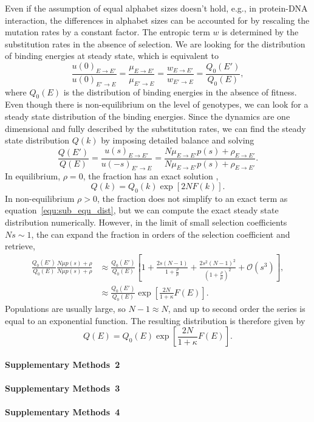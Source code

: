 \documentclass[10pt,a4paper]{article}
\begin{document}
Even if the assumption of equal alphabet sizes doesn't hold, e.g., in protein-DNA interaction, the differences in alphabet sizes can be accounted for 
by rescaling the mutation rates by a constant factor. The entropic term $w$ is determined by the substitution rates in the absence of selection.
We are looking for the distribution of binding energies at steady state, which is equivalent to 
\begin{equation}
\frac{u(0)_{E\rightarrow E'}}{u(0)_{E'\rightarrow E}} = \frac{\mu_{E\rightarrow E'}}{\mu_{E'\rightarrow E}}= \frac{w_{E\rightarrow E'}}{w_{E'\rightarrow E}} = 
\frac{Q_0(E')}{Q_0(E)},
\end{equation}
where $Q_0(E)$ is the distribution of binding energies in the absence of fitness. Even though there is non-equilibrium on the level of genotypes, 
we can look for a steady state distribution of the binding energies. Since the dynamics are one dimensional and fully described by the substitution rates, 
we can find the steady state distribution $Q(k)$ by imposing detailed balance and solving
\begin{equation}
\frac{Q(E')}{Q(E)}=\frac{u(s)_{E\rightarrow E'}}{u(-s)_{E'\rightarrow E}}=  \frac{ N\mu_{E\rightarrow E'}p(s)+\rho_{E\rightarrow E'}}{N\mu_{E\rightarrow E'}p(s)
+\rho_{E\rightarrow E'}}.
\end{equation}
In equilibrium, $\rho=0$, the fraction has an exact solution \cite{berg_adaptive_2004},
\begin{equation}
	Q(k) = Q_0(k)\exp[2NF(k)].
	\label{equ:sub_equ_dist}
\end{equation}
In non-equilibrium $\rho>0$, the fraction does not simplify to an exact term as equation~\ref{equ:sub_equ_dist}, but we can compute the exact steady state 
distribution numerically. However, in the limit of small selection coefficients $Ns\sim1$, the can expand the fraction in orders of the selection coefficient 
and retrieve,
\begin{align}
\frac{Q_0(E')}{Q_0(E)}\frac{ N\mu p(s)+\rho}{N\mu p(s)+\rho}&\approx \frac{Q_0(E')}{Q_0(E)}\left[1+\frac{2s(N-1)}{1+\frac{\rho}{\mu}}+\frac{2s^2(N-1)^2}
{(1+\frac{\rho}{\mu})^2}+\mathcal{O}(s^3)\right] ,\nonumber\\
&\approx \frac{Q_0(E')}{Q_0(E)}\exp\left[\frac{2N}{1+\kappa}F(E)\right].
\end{align}
Populations are usually large, so $N-1\approx N$, and up to second order the series is equal to an exponential function. The resulting distribution is therefore 
given by
\begin{equation}
	Q(E) = Q_0(E) \exp\left[ \frac{2N}{1+\kappa} F(E) \right].
\end{equation}


\clearpage
\paragraph*{Supplementary Methods~2}
\label{supp2}

\clearpage

\paragraph*{Supplementary Methods~3}
\label{supp3}

\clearpage

\paragraph*{Supplementary Methods~4} 
\label{supp4}

\end{document}
